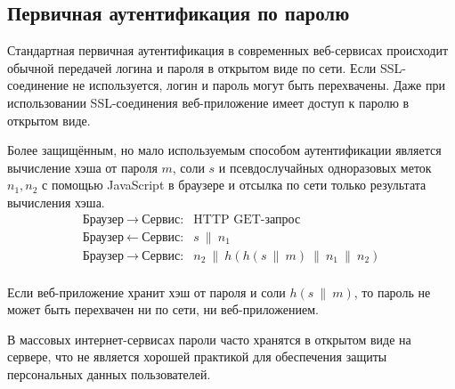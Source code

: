 \subsection{Первичная аутентификация по паролю}

Стандартная первичная аутентификация в современных веб-сервисах происходит обычной передачей логина и пароля в открытом виде по сети. Если SSL-соединение не используется, логин и пароль могут быть перехвачены. Даже при использовании SSL-соединения веб-приложение имеет доступ к паролю в открытом виде.

Более защищённым, но мало используемым способом аутентификации является вычисление хэша от пароля $m$, соли $s$ и псевдослучайных одноразовых меток $n_1, n_2$ с помощью JavaScript в браузере и отсылка по сети только результата вычисления хэша.
\[ \begin{array}{ll}
    \text{Браузер} ~\rightarrow~ \text{Сервис:} & \text{HTTP GET-запрос} \\
    \text{Браузер} ~\leftarrow~ \text{Сервис:}  & s ~\|~ n_1 \\
    \text{Браузер} ~\rightarrow~ \text{Сервис:} & n_2 ~\|~ h( h(s ~\|~ m) ~\|~ n_1 ~\|~ n_2) \\
\end{array} \]

Если веб-приложение хранит хэш от пароля и соли $h(s ~\|~ m)$, то пароль не может быть перехвачен ни по сети, ни веб-приложением.

В массовых интернет-сервисах пароли часто хранятся в открытом виде на сервере, что не является хорошей практикой для обеспечения защиты персональных данных пользователей.




